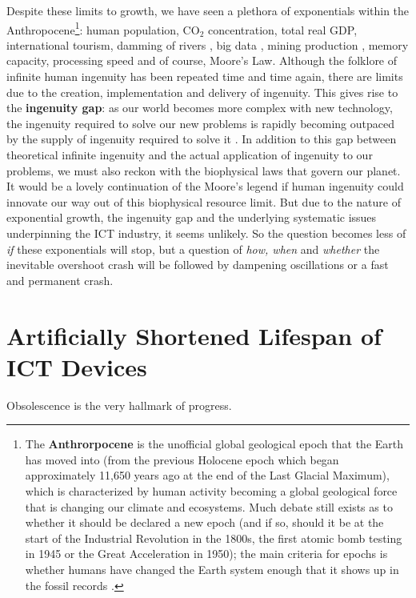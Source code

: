 \documentclass{article}
\begin{document}
Despite these limits to growth, we have seen a plethora of exponentials within the Anthropocene\footnote{The \textbf{Anthrorpocene} is the unofficial global geological epoch that the Earth has moved into (from the previous Holocene epoch which began approximately 11,650 years ago at the end of the Last Glacial Maximum), which is characterized by human activity becoming a global geological force that is changing our climate and ecosystems. Much debate still exists as to whether it should be declared a new epoch (and if so, should it be at the start of the Industrial Revolution in the 1800s, the first atomic bomb testing in 1945 or the Great Acceleration in 1950); the main criteria for epochs is whether humans have changed the Earth system enough that it shows up in the fossil records \cite{nationalgeographic2019anthropocene, steffen2011anthropocene}.}: human population, CO$_2$ concentration, total real GDP, international tourism, damming of rivers \cite{steffen2011anthropocene}, big data \cite{statista2021bigdata}, mining production \cite{mudd2007sustainability}, memory capacity, processing speed \cite{owid2020technologicalprogress} and of course, Moore's Law. 
Although the folklore of infinite human ingenuity has been repeated time and time again, there are limits due to the creation, implementation and delivery of ingenuity. This gives rise to the \textbf{ingenuity gap}: as our world becomes more complex with new technology, the ingenuity required to solve our new problems is rapidly becoming outpaced by the supply of ingenuity required to solve it \cite{homer2001ingenuity}. In addition to this gap between theoretical infinite ingenuity and the actual application of ingenuity to our problems, we must also reckon with the biophysical laws that govern our planet. It would be a lovely continuation of the Moore's legend if human ingenuity could innovate our way out of this biophysical resource limit. But due to the nature of exponential growth, the ingenuity gap and the underlying systematic issues underpinning the ICT industry, it seems unlikely. So the question becomes less of \textit{if} these exponentials will stop, but a question of \textit{how, when} and \textit{whether} the inevitable overshoot crash will be followed by dampening oscillations or a fast and permanent crash.

\cleardoublepage
\section{Artificially Shortened Lifespan of ICT Devices} \label{SECTION_PLANNED_OBSOLESCENCE}
 \begin{fquote} 
 Obsolescence is the very hallmark of progress.
 \end{fquote}
\end{document}
